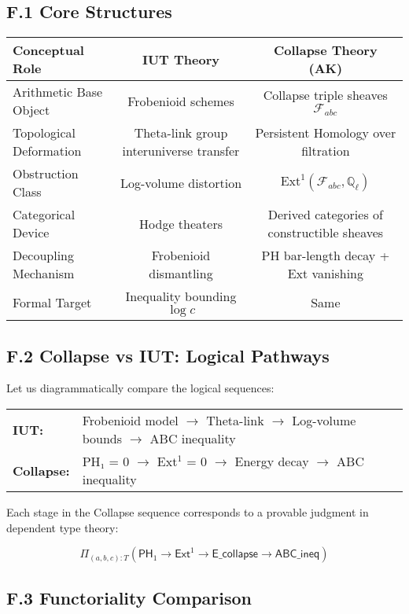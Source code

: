 \documentclass[11pt]{article}
\begin{document}
\subsection*{F.1 Core Structures}

\begin{tabular}{|l|c|c|}
\hline
\textbf{Conceptual Role} & \textbf{IUT Theory} & \textbf{Collapse Theory (AK)} \\
\hline
Arithmetic Base Object & Frobenioid schemes & Collapse triple sheaves \( \mathcal{F}_{abc} \) \\
Topological Deformation & Theta-link group interuniverse transfer & Persistent Homology over filtration \\
Obstruction Class & Log-volume distortion & \( \mathrm{Ext}^1(\mathcal{F}_{abc}, \mathbb{Q}_\ell) \) \\
Categorical Device & Hodge theaters & Derived categories of constructible sheaves \\
Decoupling Mechanism & Frobenioid dismantling & PH bar-length decay + Ext vanishing \\
Formal Target & Inequality bounding \( \log c \) & Same \\
\hline
\end{tabular}

\subsection*{F.2 Collapse vs IUT: Logical Pathways}

Let us diagrammatically compare the logical sequences:

\begin{center}
\begin{tabular}{ll}
\textbf{IUT:} & Frobenioid model \(\to\) Theta-link \(\to\) Log-volume bounds \(\to\) ABC inequality \\
\textbf{Collapse:} & PH₁ = 0 \(\to\) Ext$^1$ = 0 \(\to\) Energy decay \(\to\) ABC inequality \\
\end{tabular}
\end{center}

Each stage in the Collapse sequence corresponds to a provable judgment in dependent type theory:

\[
\Pi_{(a,b,c):T} \left( \mathsf{PH}_1 \to \mathsf{Ext}^1 \to \mathsf{E\_collapse} \to \mathsf{ABC\_ineq} \right)
\]

\subsection*{F.3 Functoriality Comparison}
\end{document}
